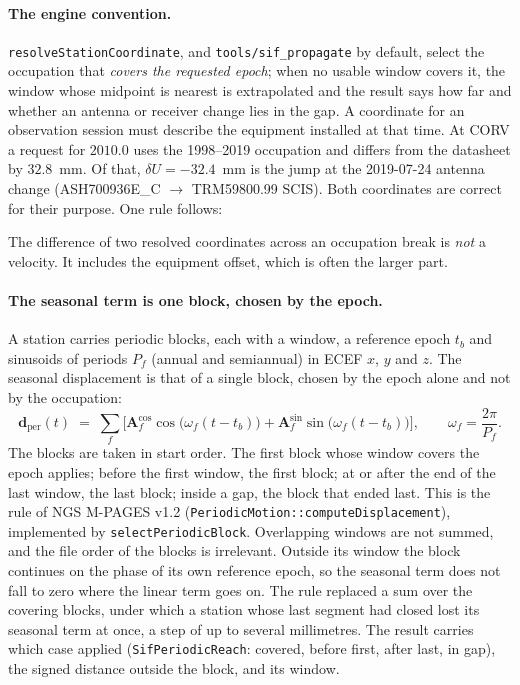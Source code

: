 \documentclass[main.tex]{subfiles}
\begin{document}
\paragraph{The engine convention.}  \texttt{resolveStationCoordinate},
and \texttt{tools/sif\_propagate} by default, select the occupation that
\emph{covers the requested epoch}; when no usable window covers it, the
window whose midpoint is nearest is extrapolated and the result says
how far and whether an antenna or receiver change lies in the gap.  A
coordinate for an observation
session must describe the equipment installed at that time.  At CORV a
request for $2010.0$ uses the 1998--2019 occupation and differs from the
datasheet by $32.8$~mm.  Of that, $\delta U = -32.4$~mm is the jump at
the 2019-07-24 antenna change (ASH700936E\_C $\to$ TRM59800.99 SCIS).
Both coordinates are correct for their purpose.  One rule follows:

\begin{remark}
The difference of two resolved coordinates across an occupation break
is \emph{not} a velocity.  It includes the equipment offset, which is
often the larger part.
\end{remark}

\paragraph{The seasonal term is one block, chosen by the epoch.}
A station carries periodic blocks, each with a window, a reference epoch
$t_b$ and sinusoids of periods $P_f$ (annual and semiannual) in ECEF
$x$, $y$ and $z$.  The
seasonal displacement is that of a single block, chosen by the epoch
alone and not by the occupation:
\begin{equation}
\bm{d}_{\mathrm{per}}(t) \;=\; \sum_{f}\Big[\bm{A}^{\cos}_{f}\cos\big(\omega_f(t-t_b)\big)
  + \bm{A}^{\sin}_{f}\sin\big(\omega_f(t-t_b)\big)\Big],
\qquad \omega_f = \frac{2\pi}{P_f}.
\label{eq:trf-periodic}
\end{equation}
The blocks are taken in start order.  The first block whose window
covers the epoch applies; before the first window, the first block; at
or after the end of the last window, the last block; inside a gap, the
block that ended last.  This is the rule of NGS M-PAGES v1.2
(\texttt{PeriodicMotion::computeDisplacement}), implemented by
\texttt{selectPeriodicBlock}.  Overlapping windows are not summed, and
the file order of the blocks is irrelevant.  Outside its window the
block continues on the phase of its own reference epoch, so the seasonal
term does not fall to zero where the linear term goes on.  The rule
replaced a sum over the covering blocks, under which a station whose
last segment had closed lost its seasonal term at once, a step of up to
several millimetres.  The result carries which case applied
(\texttt{SifPeriodicReach}: covered, before first, after last, in gap),
the signed distance outside the block, and its window.
\end{document}
